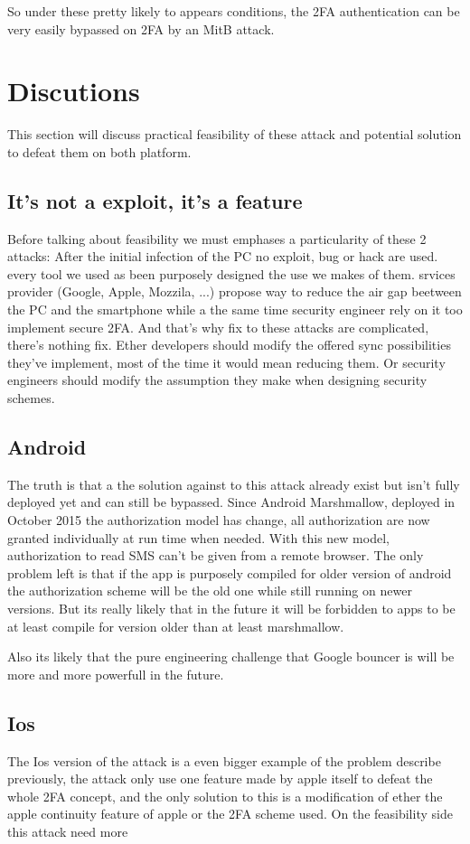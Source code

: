 \documentclass[11pt, a4paper,twocolumn]{article}
\begin{document}
So under these pretty likely to appears conditions, the 2FA authentication can be very easily bypassed on 2FA by an MitB attack.


\section{Discutions} 
This section will discuss practical feasibility of these attack and potential solution to defeat them on both platform. 
\subsection{It's not a exploit, it's a feature}
Before talking about feasibility we must emphases a particularity of these 2 attacks: After the initial infection of the PC no exploit, bug or hack are used. every tool we used as been purposely designed the use we makes of them. srvices provider (Google, Apple, Mozzila, ...) propose way to reduce the air gap beetween the PC and the smartphone while a the same time security engineer rely on it too implement secure 2FA. And that's why fix to these attacks are complicated, there's nothing fix.
Ether developers should modify the offered sync possibilities they've implement, most of the time it would mean reducing them. Or security engineers should modify the assumption they make when designing security schemes. 
\subsection{Android}

The truth is that a the solution against to this attack already exist but isn't fully deployed yet and can still be bypassed. Since Android Marshmallow, deployed in October 2015 the authorization model has change, all authorization are now granted individually at run time when needed. With this new model, authorization to read SMS can't be given from a remote browser. The only problem left is that if the app is purposely compiled for older version of android the authorization scheme will be the old one while still running on newer versions. But its really likely that in the future it will be forbidden to apps to be at least compile for version older than at least marshmallow.

Also its likely that the pure engineering challenge that Google bouncer is will be more and more powerfull in the future. 

\subsection{Ios}
The Ios version of the attack is a even bigger example of the problem describe previously, the attack only use one feature made by apple itself to defeat the whole 2FA concept, and the only solution to this is a modification of ether the apple continuity feature of apple or the 2FA scheme used. On the feasibility side this attack need more
\end{document}

